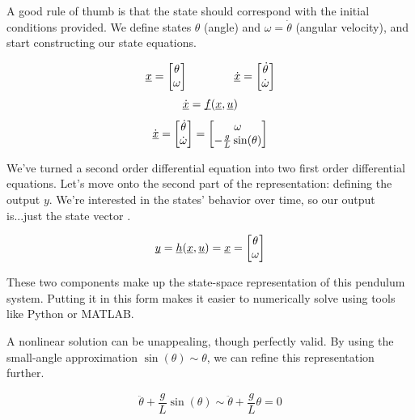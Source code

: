 \documentclass{report}
\begin{document}
\begin{onehalfspacing}
\begin{flushleft}
A good rule of thumb is that the state should correspond with the initial conditions provided. We define states \(\theta\) (angle) and \(\omega = \dot{\theta}\) (angular velocity), and start constructing our state equations.

\vspace{-0.1in}
\[\underbar{\(x\)} = \begin{bmatrix}
    \theta \\
    \omega  \end{bmatrix} \qquad \qquad \underbar{\(\dot{x}\)} = \begin{bmatrix}
        \dot{\theta} \\
        \dot{\omega}  \end{bmatrix}\]
\[\underbar{\(\dot{x}\)} = \underbar{\(f\)} (\underbar{\(x\)}, \underbar{\(u\)})\]
\vspace{-0.1in}
\[\dot{\underbar{\(x\)}} = \begin{bmatrix}
    \dot{\theta} \\
    \dot{\omega}  \end{bmatrix} = \begin{bmatrix}
    \omega \\
    -\frac{g}{L} \sin(\theta) 
\end{bmatrix}\]

We've turned a second order differential equation into two first order differential equations. Let's move onto the second part of the representation: defining the output \(y\). We're interested in the states' behavior over time, so our output is...just the state vector .

\[\underbar{\(y\)} = \underbar{\(h\)}(\underbar{\(x\)}, \underbar{\(u\)}) = \underbar{\(x\)} = \begin{bmatrix}
    \theta \\
    \omega  \end{bmatrix}\]

These two components make up the state-space representation of this pendulum system. Putting it in this form makes it easier to numerically solve using tools like Python or MATLAB.

\medskip

A nonlinear solution can be unappealing, though perfectly valid. By using the small-angle approximation \(\sin(\theta) \sim \theta\), we can refine this representation further.

\[\ddot{\theta} + \frac{g}{L} \sin(\theta) \sim \ddot{\theta} + \frac{g}{L} \theta = 0\]


\end{flushleft}
\end{onehalfspacing}
\end{document}
